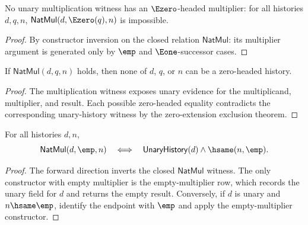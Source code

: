 \begin{lemma}
\label{thm:natmul-e0-multiplier-absurd}
No unary multiplication witness has an \(\Ezero\)-headed multiplier:
for all histories \(d,q,n\), \(\mathsf{NatMul}(d,\Ezero(q),n)\) is impossible.
\end{lemma}
\begin{proof}
By constructor inversion on the closed relation \(\mathsf{NatMul}\): its
multiplier argument is generated only by \(\emp\) and \(\Eone\)-successor cases.
\end{proof}

\begin{theorem}
\label{thm:natmul-zero-headed-component-absurd}
If \(\mathsf{NatMul}(d,q,n)\) holds, then none of \(d\), \(q\), or \(n\) can
be a zero-headed history.
\end{theorem}
\begin{proof}
The multiplication witness exposes unary evidence for the multiplicand,
multiplier, and result. Each possible zero-headed equality contradicts the
corresponding unary-history witness by the zero-extension exclusion theorem.
\end{proof}

\begin{theorem}
\label{thm:natmul-empty-right-iff}
For all histories $d,n$,
$$
\mathsf{NatMul}(d,\emp,n)
\quad\Longleftrightarrow\quad
\mathsf{UnaryHistory}(d)\land \hsame(n,\emp).
$$
\end{theorem}
\begin{proof}
The forward direction inverts the closed $\mathsf{NatMul}$ witness. The only
constructor with empty multiplier is the empty-multiplier row, which records
the unary field for $d$ and returns the empty result. Conversely, if $d$ is
unary and $n\hsame\emp$, identify the endpoint with $\emp$ and apply the
empty-multiplier constructor.
\end{proof}

